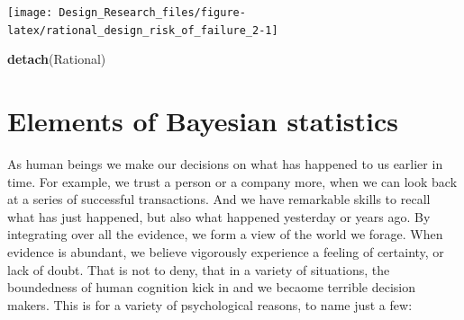 \documentclass[]{svmono}
\newenvironment{Shaded}{\begin{snugshade}}{\end{snugshade}}
\newcommand{\KeywordTok}[1]{\textcolor[rgb]{0.13,0.29,0.53}{\textbf{#1}}}
\newcommand{\DataTypeTok}[1]{\textcolor[rgb]{0.13,0.29,0.53}{#1}}
\newcommand{\DecValTok}[1]{\textcolor[rgb]{0.00,0.00,0.81}{#1}}
\newcommand{\FloatTok}[1]{\textcolor[rgb]{0.00,0.00,0.81}{#1}}
\newcommand{\StringTok}[1]{\textcolor[rgb]{0.31,0.60,0.02}{#1}}
\newcommand{\OperatorTok}[1]{\textcolor[rgb]{0.81,0.36,0.00}{\textbf{#1}}}
\newcommand{\NormalTok}[1]{#1}
\begin{document}
\begin{Shaded}
\end{Shaded}

\texttt{[image: Design\_Research\_files/figure-latex/rational\_design\_risk\_of\_failure\_2-1]}

\begin{Shaded}
\begin{Highlighting}[]
\KeywordTok{detach}\NormalTok{(Rational)}
\end{Highlighting}
\end{Shaded}

\chapter{Elements of Bayesian statistics}\label{bayesian_statistics}

As human beings we make our decisions on what has happened to us earlier
in time. For example, we trust a person or a company more, when we can
look back at a series of successful transactions. And we have remarkable
skills to recall what has just happened, but also what happened
yesterday or years ago. By integrating over all the evidence, we form a
view of the world we forage. When evidence is abundant, we believe
vigorously experience a feeling of certainty, or lack of doubt. That is
not to deny, that in a variety of situations, the boundedness of human
cognition kick in and we becaome terrible decision makers. This is for a
variety of psychological reasons, to name just a few:
\end{document}
